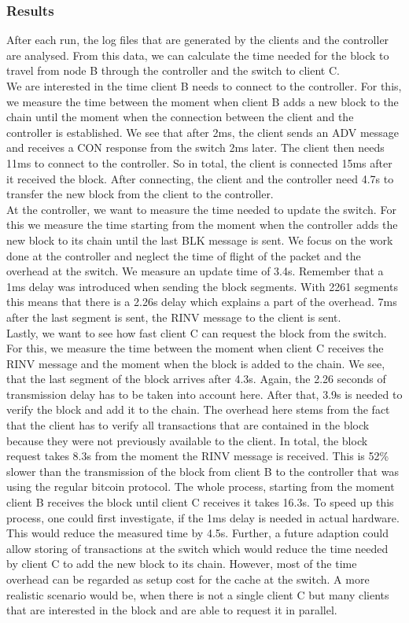 \subsubsection{Results}
After each run, the log files that are generated by the clients and the controller are analysed. From this data, we can calculate the time needed for the block to travel from node B through the controller and the switch to client C.\\
We are interested in the time client B needs to connect to the controller. For this, we measure the time between the moment when client B adds a new block to the chain until the moment when the connection between the client and the controller is established. We see that after 2ms, the client sends an ADV message and receives a CON response from the switch 2ms later. The client then needs 11ms to connect to the controller. So in total, the client is connected 15ms after it received the block. After connecting, the client and the controller need 4.7s to transfer the new block from the client to the controller.\\
At the controller, we want to measure the time needed to update the switch. For this we measure the time starting from the moment when the controller adds the new block to its chain until the last BLK message is sent. We focus on the work done at the controller and neglect the time of flight of the packet and the overhead at the switch. We measure an update time of 3.4s. Remember that a 1ms delay was introduced when sending the block segments. With 2261 segments this means that there is a 2.26s delay which explains a part of the overhead. 7ms after the last segment is sent, the RINV message to the client is sent.\\
Lastly, we want to see how fast client C can request the block from the switch. For this, we measure the time between the moment when client C receives the RINV message and the moment when the block is added to the chain. We see, that the last segment of the block arrives after 4.3s. Again, the 2.26 seconds of transmission delay has to be taken into account here. After that, 3.9s is needed to verify the block and add it to the chain. The overhead here stems from the fact that the client has to verify all transactions that are contained in the block because they were not previously available to the client. In total, the block request takes 8.3s from the moment the RINV message is received. This is 52\% slower than the transmission of the block from client B to the controller that was using the regular bitcoin protocol. 
The whole process, starting from the moment client B receives the block until client C receives it takes 16.3s. To speed up this process, one could first investigate, if the 1ms delay is needed in actual hardware. This would reduce the measured time by 4.5s. Further, a future adaption could allow storing of transactions at the switch which would reduce the time needed by client C to add the new block to its chain. However, most of the time overhead can be regarded as setup cost for the cache at the switch. A more realistic scenario would be, when there is not a single client C but many clients that are interested in the block and are able to request it in parallel.

